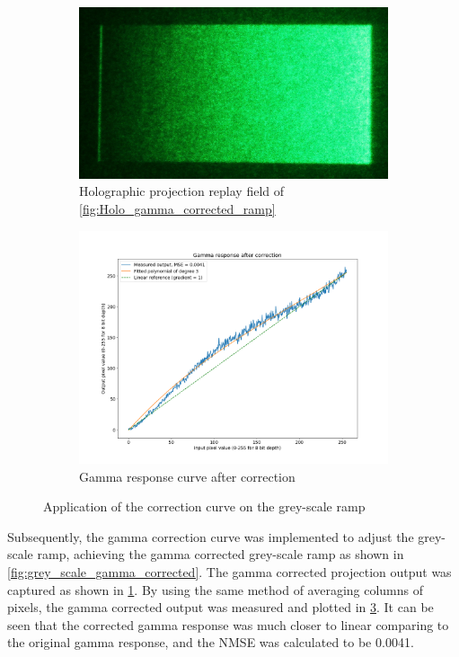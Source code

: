 \begin{figure}[H]
  \hfill
  \begin{subfigure}[c]{0.32\textwidth}
    \includegraphics[width=\textwidth]{Replay field of holographic projection of gama corrected ramp.jpg}
    \caption{Holographic projection replay field of \cref{fig:Holo_gamma_corrected_ramp}}\label{fig:Replay field of holographic projection of gama corrected ramp}
  \end{subfigure}

  \begin{subfigure}[t]{0.6\textwidth}
    \includegraphics[width=\textwidth]{GammaResponseCorrected.png}
    \caption{Gamma response curve after correction}\label{fig:GammaResponseCorrected}
  \end{subfigure}

  \caption{Application of the correction curve on the grey-scale ramp}
\end{figure}

Subsequently, the gamma correction curve was implemented to adjust the grey-scale ramp, achieving the gamma corrected grey-scale ramp as shown in \cref{fig:grey_scale_gamma_corrected}. The gamma corrected projection output was captured as shown in \cref{fig:Replay field of holographic projection of gama corrected ramp}. By using the same method of averaging columns of pixels, the gamma corrected output was measured and plotted in \cref{fig:GammaResponseCorrected}. It can be seen that the corrected gamma response was much closer to linear comparing to the original gamma response, and the NMSE was calculated to be 0.0041.

